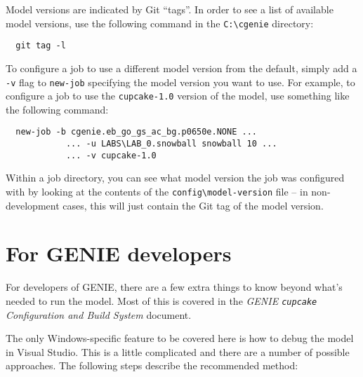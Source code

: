 \documentclass[a4paper,10pt,article]{memoir}
\begin{document}
Model versions are indicated by Git ``tags''.  In order to see a list
of available model versions, use the following command in the
\texttt{C:\textbackslash{}cgenie} directory:
\begin{verbatim}
  git tag -l
\end{verbatim}
To configure a job to use a different model version from the default,
simply add a \texttt{-v} flag to \texttt{new-job} specifying the model
version you want to use.  For example, to configure a job to use the
\texttt{cupcake-1.0} version of the model, use something like the
following command:
\begin{verbatim}
  new-job -b cgenie.eb_go_gs_ac_bg.p0650e.NONE ...
            ... -u LABS\LAB_0.snowball snowball 10 ...
            ... -v cupcake-1.0
\end{verbatim}
Within a job directory, you can see what model version the job was
configured with by looking at the contents of the
\texttt{config\textbackslash{}model-version} file -- in
non-development cases, this will just contain the Git tag of the model
version.


\chapter{For GENIE developers}
\label{sec:genie-devs}

For developers of GENIE, there are a few extra things to know beyond
what's needed to run the model.  Most of this is covered in the
\emph{GENIE \texttt{cupcake} Configuration and Build System} document.

The only Windows-specific feature to be covered here is how to debug
the model in Visual Studio.  This is a little complicated and there
are a number of possible approaches.  The following steps describe the
recommended method:
\end{document}
